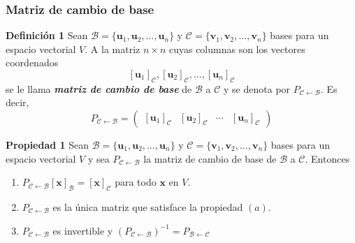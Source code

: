 {\nologo
\begin{frame}\frametitle{Matriz de cambio de base}

\begin{defi}{\textbf{Definición 1}}\justifying
	Sean $\mathcal{B}=\{\mathbf{u}_1, \mathbf{u}_2, \hdots , \mathbf{u}_n \}$ y $\mathcal{C}=\{\mathbf{v}_1, \mathbf{v}_2, \hdots , \mathbf{v}_n \}$  bases para un espacio  vectorial $V$. A la matriz $n\times n$ cuyas columnas son los vectores coordenados
	\[
	\left[ \mathbf{u}_1 \right]_{\mathcal{C}}, \left[ \mathbf{u}_2 \right]_{\mathcal{C}}, \hdots, \left[ \mathbf{u}_n \right]_{\mathcal{C}}
	\]
	se le llama \textbf{\textit{matriz de cambio de base}} de $\mathcal{B}$ a $\mathcal{C}$ y se denota por $P_{\mathcal{C} \leftarrow\mathcal{B}}$. Es decir,	
	\[	
	P_{\mathcal{C} \leftarrow\mathcal{B}} =
	\left( 
	\begin{array}{c|c|c|c} \left[ \mathbf{u}_1 \right]_{\mathcal{C}} & \left[ \mathbf{u}_2 \right]_{\mathcal{C}} & \cdots & \left[ \mathbf{u}_n \right]_{\mathcal{C}}
	\end{array} 
	\right)
	\]
\end{defi}	

\vspace{0mm}

\begin{prop}{\textbf{Propiedad 1}}
	\justifying
	Sean $\mathcal{B}=\{\mathbf{u}_1, \mathbf{u}_2, \hdots , \mathbf{u}_n \}$ y $\mathcal{C}=\{\mathbf{v}_1, \mathbf{v}_2, \hdots , \mathbf{v}_n \}$  bases para un espacio  vectorial $V$ y sea $P_{\mathcal{C} \leftarrow\mathcal{B}}$ la matriz de cambio 
	de base de $\mathcal{B}$ a $\mathcal{C}$. Entonces
	\begin{enumerate}
		\item[\labelname{$a$}] $P_{\mathcal{C} \leftarrow\mathcal{B}}\left[ \mathbf{x} \right]_{\mathcal{B}}=\left[ \mathbf{x} \right]_{\mathcal{C}}$ para todo $\mathbf{x}$ en $V$.
		\item[\labelname{$b$}] $P_{\mathcal{C} \leftarrow\mathcal{B}}$ es la única matriz que satisface la propiedad $(a)$.
		\item[\labelname{$c$}] $P_{\mathcal{C} \leftarrow\mathcal{B}}$ es invertible y $\left(P_{\mathcal{C} \leftarrow\mathcal{B}}\right)^{-1}=P_{\mathcal{B} \leftarrow\mathcal{C}}$		
	\end{enumerate}
\end{prop}	

\end{frame}
}


